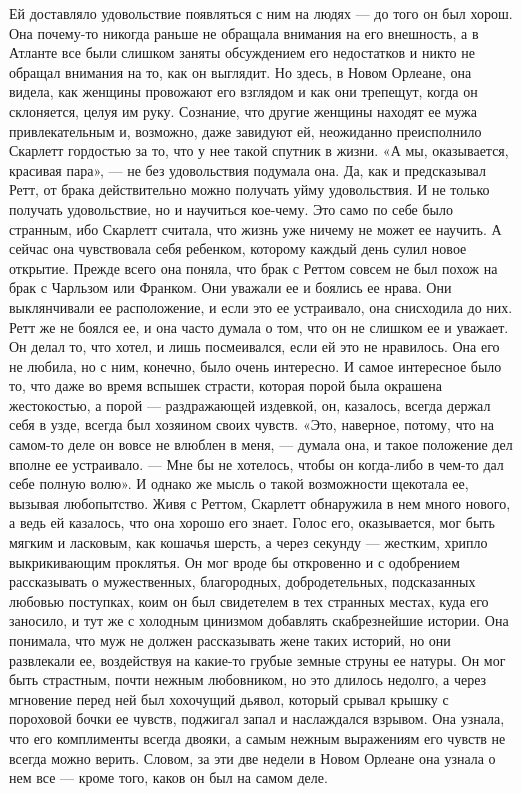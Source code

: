 Ей доставляло удовольствие появляться с ним на людях — до того он был хорош. Она почему-то никогда раньше не обращала внимания на его внешность, а в Атланте все были слишком заняты обсуждением его недостатков и никто не обращал внимания на то, как он выглядит. Но здесь, в Новом Орлеане, она видела, как женщины провожают его взглядом и как они трепещут, когда он склоняется, целуя им руку. Сознание, что другие женщины находят ее мужа привлекательным и, возможно, даже завидуют ей, неожиданно преисполнило Скарлетт гордостью за то, что у нее такой спутник в жизни.
«А мы, оказывается, красивая пара», — не без удовольствия подумала она.
Да, как и предсказывал Ретт, от брака действительно можно получать уйму удовольствия. И не только получать удовольствие, но и научиться кое-чему. Это само по себе было странным, ибо Скарлетт считала, что жизнь уже ничему не может ее научить. А сейчас она чувствовала себя ребенком, которому каждый день сулил новое открытие.
Прежде всего она поняла, что брак с Реттом совсем не был похож на брак с Чарльзом или Франком. Они уважали ее и боялись ее нрава. Они выклянчивали ее расположение, и если это ее устраивало, она снисходила до них. Ретт же не боялся ее, и она часто думала о том, что он не слишком ее и уважает. Он делал то, что хотел, и лишь посмеивался, если ей это не нравилось. Она его не любила, но с ним, конечно, было очень интересно. И самое интересное было то, что даже во время вспышек страсти, которая порой была окрашена жестокостью, а порой — раздражающей издевкой, он, казалось, всегда держал себя в узде, всегда был хозяином своих чувств. «Это, наверное, потому, что на самом-то деле он вовсе не влюблен в меня, — думала она, и такое положение дел вполне ее устраивало. — Мне бы не хотелось, чтобы он когда-либо в чем-то дал себе полную волю». И однако же мысль о такой возможности щекотала ее, вызывая любопытство.
Живя с Реттом, Скарлетт обнаружила в нем много нового, а ведь ей казалось, что она хорошо его знает. Голос его, оказывается, мог быть мягким и ласковым, как кошачья шерсть, а через секунду — жестким, хрипло выкрикивающим проклятья. Он мог вроде бы откровенно и с одобрением рассказывать о мужественных, благородных, добродетельных, подсказанных любовью поступках, коим он был свидетелем в тех странных местах, куда его заносило, и тут же с холодным цинизмом добавлять скабрезнейшие истории. Она понимала, что муж не должен рассказывать жене таких историй, но они развлекали ее, воздействуя на какие-то грубые земные струны ее натуры. Он мог быть страстным, почти нежным любовником, но это длилось недолго, а через мгновение перед ней был хохочущий дьявол, который срывал крышку с пороховой бочки ее чувств, поджигал запал и наслаждался взрывом. Она узнала, что его комплименты всегда двояки, а самым нежным выражениям его чувств не всегда можно верить. Словом, за эти две недели в Новом Орлеане она узнала о нем все — кроме того, каков он был на самом деле.
